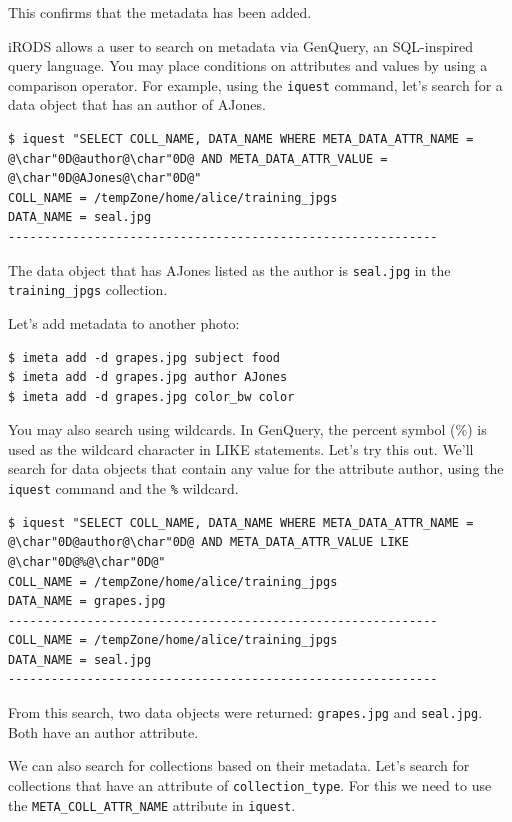 \documentclass[10pt,oneside]{memoir}
\begin{document}
This confirms that the metadata has been added.

iRODS allows a user to search on metadata via GenQuery, an SQL-inspired query language. You may place conditions on attributes and values by using a comparison operator. For example, using the \texttt{iquest} command, let's search for a data object that has an author of AJones.

\begin{lstlisting}[basicstyle=\scriptsize\ttfamily]
$ iquest "SELECT COLL_NAME, DATA_NAME WHERE META_DATA_ATTR_NAME = @\char"0D@author@\char"0D@ AND META_DATA_ATTR_VALUE = @\char"0D@AJones@\char"0D@"
COLL_NAME = /tempZone/home/alice/training_jpgs
DATA_NAME = seal.jpg
------------------------------------------------------------
\end{lstlisting}

The data object that has AJones listed as the author is \texttt{seal.jpg} in the \texttt{training\_jpgs} collection.

Let's add metadata to another photo:

\begin{lstlisting}
$ imeta add -d grapes.jpg subject food
$ imeta add -d grapes.jpg author AJones
$ imeta add -d grapes.jpg color_bw color
\end{lstlisting}

You may also search using wildcards. In GenQuery, the percent symbol (\%) is used as the wildcard character in LIKE statements. Let's try this out. We'll search for data objects that contain any value for the attribute author, using the \texttt{iquest} command and the \texttt{\%} wildcard.

\begin{lstlisting}[basicstyle=\scriptsize\ttfamily]
$ iquest "SELECT COLL_NAME, DATA_NAME WHERE META_DATA_ATTR_NAME = @\char"0D@author@\char"0D@ AND META_DATA_ATTR_VALUE LIKE @\char"0D@%@\char"0D@"
COLL_NAME = /tempZone/home/alice/training_jpgs
DATA_NAME = grapes.jpg
------------------------------------------------------------
COLL_NAME = /tempZone/home/alice/training_jpgs
DATA_NAME = seal.jpg
------------------------------------------------------------
\end{lstlisting}

From this search, two data objects were returned: \texttt{grapes.jpg} and \texttt{seal.jpg}. Both have an author attribute.

We can also search for collections based on their metadata. Let's search for collections that have an attribute of \texttt{collection\_type}. For this we need to use the \texttt{META\_COLL\_ATTR\_NAME} attribute in \texttt{iquest}.
\end{document}
